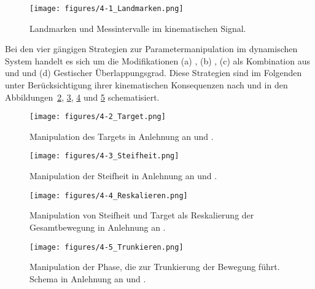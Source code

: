 \begin{figure}
	\texttt{[image: figures/4-1\_Landmarken.png]}
	\caption{Landmarken und Messintervalle im kinematischen Signal.}
	\label{figure:0401}
\end{figure}

Bei den vier gängigen Strategien zur Parametermanipulation im dynamischen System handelt es sich um die Modifikationen (a) , (b) , (c)  als Kombination aus  und  und (d) Gestischer Überlappungsgrad. Diese Strategien sind im Folgenden unter Berücksichtigung ihrer kinematischen Konsequenzen nach \citet{Beckman1992} und \citet{Cho2002a} in den Abbildungen~\ref{figure:0402}, \ref{figure:0403}, \ref{figure:0404} und \ref{figure:0405} schematisiert.

\begin{figure}[p]
	\texttt{[image: figures/4-2\_Target.png]}
	\caption{Manipulation des Targets in Anlehnung an \citet[71]{Beckman1992} und \citet[17]{Cho2002a}.}
	\label{figure:0402}
\end{figure}


\begin{figure}[p]
	\texttt{[image: figures/4-3\_Steifheit.png]}
	\caption{Manipulation der Steifheit in Anlehnung an \citet[71]{Beckman1992} und \citet[17]{Cho2002a}.}
	\label{figure:0403}
\end{figure}

\begin{figure}[p]
	\texttt{[image: figures/4-4\_Reskalieren.png]}
	\caption{Manipulation von Steifheit und Target als Reskalierung der Gesamtbewegung in Anlehnung an \citet[17]{Cho2002a}.}
	\label{figure:0404}
\end{figure}

\begin{figure}[p]
	\texttt{[image: figures/4-5\_Trunkieren.png]}
	\caption{Manipulation der Phase, die zur Trunkierung der Bewegung führt. Schema in Anlehnung an \citet[71]{Beckman1992} und \citet[17]{Cho2002a}.}
	\label{figure:0405}
\end{figure}


